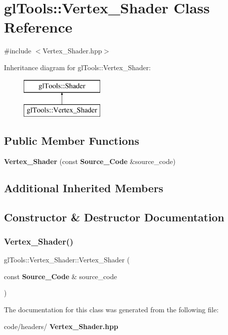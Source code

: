 \section{gl\+Tools\+::Vertex\+\_\+\+Shader Class Reference}
\label{classgl_tools_1_1_vertex___shader}


{\ttfamily \#include $<$Vertex\+\_\+\+Shader.\+hpp$>$}

Inheritance diagram for gl\+Tools\+::Vertex\+\_\+\+Shader\+:\begin{figure}[H]
\begin{center}
\leavevmode
\includegraphics[height=2.000000cm]{classgl_tools_1_1_vertex___shader}
\end{center}
\end{figure}
\subsection*{Public Member Functions}
\begin{DoxyCompactItemize}
\item 
\textbf{ Vertex\+\_\+\+Shader} (const \textbf{ Source\+\_\+\+Code} \&source\+\_\+code)
\end{DoxyCompactItemize}
\subsection*{Additional Inherited Members}


\subsection{Constructor \& Destructor Documentation}
\mbox{\label{classgl_tools_1_1_vertex___shader_a8531df1feaf5473b571534a271e0ef74}} 
\subsubsection{Vertex\_Shader()}
{\footnotesize\ttfamily gl\+Tools\+::\+Vertex\+\_\+\+Shader\+::\+Vertex\+\_\+\+Shader (\begin{DoxyParamCaption}\item[{const \textbf{ Source\+\_\+\+Code} \&}]{source\+\_\+code }\end{DoxyParamCaption})\hspace{0.3cm}{\ttfamily [inline]}}



The documentation for this class was generated from the following file\+:\begin{DoxyCompactItemize}
\item 
code/headers/\textbf{ Vertex\+\_\+\+Shader.\+hpp}\end{DoxyCompactItemize}
